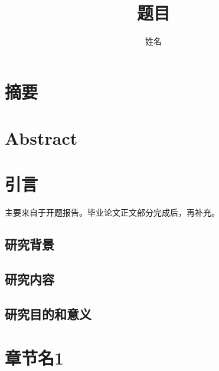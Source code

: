 \documentclass[cs4size,openany]{ctexbook}
\begin{document}
	
	
	\title{题目}
	\author{姓名}
	\date{}
	\maketitle
	
	\chapter*{摘要}
	\thispagestyle{fancy} %
	
	\zhlipsum[1]
	
	\chapter*{Abstract}
	\thispagestyle{fancy} %
	
	\lipsum[1]
	
	\tableofcontents  %
	\thispagestyle{fancy} %
	
	\chapter{引言}
	\thispagestyle{fancy} %
	
	主要来自于开题报告。毕业论文正文部分完成后，再补充。
	
	
	\section{研究背景}\indent

	\zhlipsum[1-3]
	
	\section{研究内容}\indent
	
	\zhlipsum[1-3]
	
	\section{研究目的和意义}\indent
	
	\zhlipsum[1-3]
	
	\chapter{章节名1}
	\thispagestyle{fancy} %
	
\end{document}
